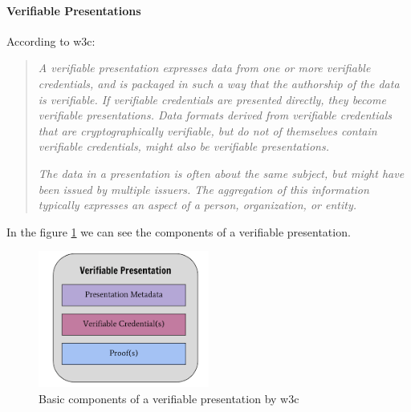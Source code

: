 \documentclass[a4paper, 12pt]{article} %
\begin{document}
                \paragraph{Verifiable Presentations}
                    According to \acrshort{w3c}\cite{w3c-vc}:
                    \begin{quote}
                        \textit{A verifiable presentation expresses data from one or more verifiable credentials, and is packaged in such a way that the authorship of the data is verifiable. If verifiable credentials are presented directly, they become verifiable presentations. Data formats derived from verifiable credentials that are cryptographically verifiable, but do not of themselves contain verifiable credentials, might also be verifiable presentations.}
                        
                        \textit{The data in a presentation is often about the same subject, but might have been issued by multiple issuers. The aggregation of this information typically expresses an aspect of a person, organization, or entity.}
                    \end{quote}
                    In the figure \ref{fig:ssi-vp} we can see the components of a verifiable presentation.
                    \begin{figure}[ht] 
                        \centering
                        \includegraphics[width=0.5\textwidth]{ssi-vp.png}
                        \caption{Basic components of a verifiable presentation by \acrshort{w3c}}
                        \label{fig:ssi-vp}
                    \end{figure}
\end{document}
